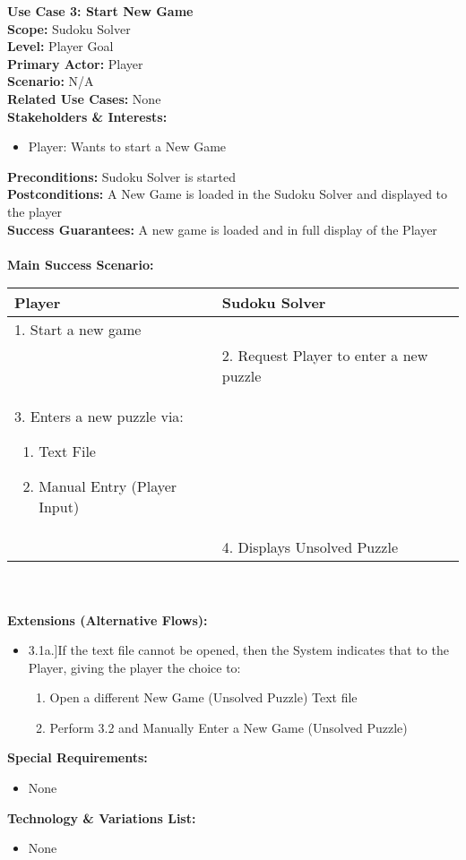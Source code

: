 \documentclass[letterpaper]{article}
\begin{document}
\noindent
\textbf{Use Case 3:  Start New Game}\\
\textbf{Scope:  }Sudoku Solver\\
\textbf{Level:  }Player Goal\\
\textbf{Primary Actor:  }Player\\
\textbf{Scenario:  }N/A\\
\textbf{Related Use Cases:  }None\\
\textbf{Stakeholders \& Interests:}
\begin{itemize}
\item Player:  Wants to start a New Game
\end{itemize}
\textbf{Preconditions:  }Sudoku Solver is started\\
\textbf{Postconditions:  }A New Game is loaded in the Sudoku Solver
and displayed to the player\\
\textbf{Success Guarantees: }A new game is loaded and in full display
of the Player\\\\
\textbf{Main Success Scenario:  }\\
\begin{tabular}{|p{5.75cm}|p{5.75cm}|}\hline
\textbf{Player} & \textbf{Sudoku Solver}\\\hline
1.  Start a new game & \\\hline
& 2. Request Player to enter a new puzzle\\\hline
3. Enters a new puzzle via:
\begin{enumerate}
\item Text File
\item Manual Entry (Player Input)
\end{enumerate} & \\\hline
& 4. Displays Unsolved Puzzle\\\hline
\end{tabular}\\\\
\textbf{Extensions (Alternative Flows):}
\begin{itemize}
\item[]3.1a.]If the text file cannot be opened, then the System
indicates that to the Player, giving the player the choice to:
\begin{enumerate}
\item Open a different New Game (Unsolved Puzzle) Text file
\item Perform 3.2 and Manually Enter a New Game (Unsolved Puzzle)
\end{enumerate}
\end{itemize}
\textbf{Special Requirements: }
\begin{itemize}
\item None
\end{itemize}
\textbf{Technology \& Variations List:}
\begin{itemize}
\item None
\end{itemize}
\end{document}

